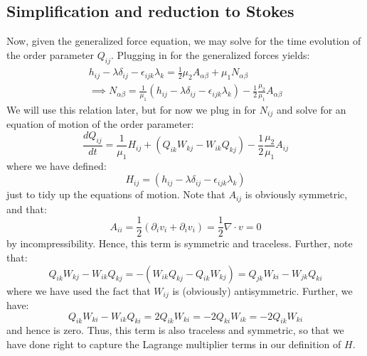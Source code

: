 \documentclass[reqno]{article}
\begin{document}
  \subsection{Simplification and reduction to Stokes}
  Now, given the generalized force equation, we may solve for the time
  evolution of the order parameter $Q_{ij}$.
  Plugging in for the generalized forces yields:
  \begin{equation} \label{relative-rotation-eq}
    \begin{split}
    h_{ij} - \lambda \delta_{ij} - \epsilon_{ijk} \lambda_k
    = \tfrac12 \mu_2 A_{\alpha \beta}
    + \mu_1 N_{\alpha \beta} \\
    \implies
    N_{\alpha \beta}
    =
    \frac{1}{\mu_1}
    \left(
      h_{ij} - \lambda \delta_{ij} - \epsilon_{ijk} \lambda_k
    \right)
    - \frac12 \frac{\mu_2}{\mu_1} A_{\alpha \beta}
    \end{split}
  \end{equation}
  We will use this relation later, but for now we plug in for $N_{ij}$ and solve
  for an equation of motion of the order parameter:
  \begin{equation}
    \frac{d Q_{ij}}{dt}
    =
    \frac{1}{\mu_1}
    H_{ij}
    +
    \left(
      Q_{ik} W_{kj} - W_{ik} Q_{kj}
    \right)
    - \frac12 \frac{\mu_2}{\mu_1} A_{ij}
  \end{equation}
  where we have defined:
  \begin{equation}
    H_{ij}
    =
    \left(
      h_{ij} - \lambda \delta_{ij} - \epsilon_{ijk} \lambda_k
    \right)
  \end{equation}
  just to tidy up the equations of motion.
  Note that $A_{ij}$ is obviously symmetric, and that:
  \begin{equation}
    A_{ii}
    =
    \frac12 \left(
      \partial_i v_i + \partial_i v_i
    \right)
    = \frac12 \nabla \cdot v
    = 0
  \end{equation}
  by incompressibility.
  Hence, this term is symmetric and traceless.
  Further, note that:
  \begin{equation}
    Q_{ik} W_{kj} - W_{ik} Q_{kj}
    = - (W_{ik} Q_{kj} - Q_{ik} W_{kj})
    = Q_{jk} W_{ki} - W_{jk} Q_{ki}
  \end{equation}
  where we have used the fact that $W_{ij}$ is (obviously) antisymmetric.
  Further, we have:
  \begin{equation}
    Q_{ik} W_{ki} - W_{ik} Q_{ki}
    = 2 Q_{ik} W_{ki}
    = -2 Q_{ki} W_{ik}
    = -2 Q_{ik} W_{ki}
  \end{equation}
  and hence is zero.
  Thus, this term is also traceless and symmetric, so that we have done right to
  capture the Lagrange multiplier terms in our definition of $H$.
  
\end{document}
